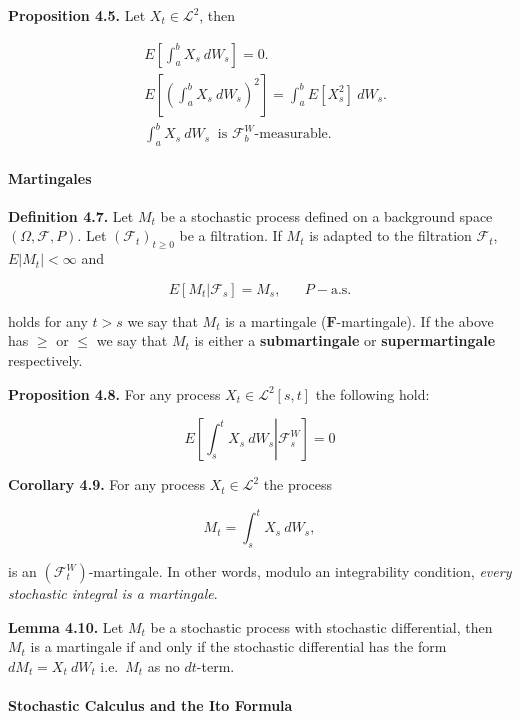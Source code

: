\documentclass[
]{article}
\begin{document}
\textbf{Proposition 4.5.} Let \(X_t\in\mathcal{L}^2\), then

\begin{align*}
&E\left[\int_a^b X_s\ dW_s\right]=0.\tag{4.11}\\
&E\left[\left(\int_a^b X_s\ dW_s\right)^2\right]=\int_a^b E[ X_s^2]\ dW_s.\tag{4.13}\\
&\int_a^b X_s\ dW_s\ \text{ is }\mathcal{F}_b^W\text{-measurable.}\tag{4.14}
\end{align*}

\hypertarget{martingales}{%
\paragraph{Martingales}\label{martingales}}

\textbf{Definition 4.7.} Let \(M_t\) be a stochastic process defined on
a background space \((\Omega,\mathcal{F},P)\). Let
\((\mathcal{F}_t)_{t\ge 0}\) be a filtration. If \(M_t\) is adapted to
the filtration \(\mathcal{F}_t\), \(E\vert M_t\vert <\infty\) and

\[E[M_t\vert \mathcal{F}_s]=M_s,\hspace{20pt}P-\text{a.s.}\]

holds for any \(t>s\) we say that \(M_t\) is a martingale
(\(\mathbf{F}\)-martingale). If the above has \(\ge\) or \(\le\) we say
that \(M_t\) is either a \textbf{submartingale} or
\textbf{supermartingale} respectively.

\textbf{Proposition 4.8.} For any process \(X_t\in\mathcal{L}^2[s,t]\)
the following hold:

\[
E\left[\left.\int_s^t X_s\ dW_s\right\vert\mathcal{F}_s^W\right]=0
\]

\textbf{Corollary 4.9.} For any process \(X_t\in\mathcal{L}^2\) the
process

\[
M_t=\int_s^t X_s\ dW_s,
\]

is an \((\mathcal{F}_t^W)\)-martingale. In other words, modulo an
integrability condition, \emph{every stochastic integral is a
martingale}.

\textbf{Lemma 4.10.} Let \(M_t\) be a stochastic process with stochastic
differential, then \(M_t\) is a martingale if and only if the stochastic
differential has the form \(dM_t=X_t\ dW_t\) i.e.~\(M_t\) as no
\(dt\)-term.

\hypertarget{stochastic-calculus-and-the-ito-formula}{%
\paragraph{Stochastic Calculus and the Ito
Formula}\label{stochastic-calculus-and-the-ito-formula}}
\end{document}
